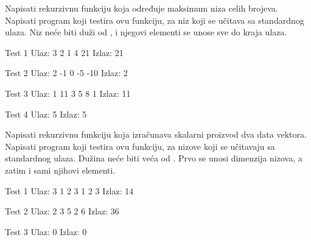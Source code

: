 
\begin{Exercise}[label=109]
Napisati rekurzivnu funkciju koja određuje maksimum niza
  celih brojeva. Napisati program koji testira ovu funkciju, za niz
  koji se učitava sa standardnog ulaza. Niz neće biti duži od , i
  njegovi elementi se unose sve do kraja ulaza.
  
\begin{miditest}
\begin{test}{Test 1}
Ulaz:   3 2 1 4 21    
Izlaz:  21              
\end{test}
\end{miditest}
\begin{miditest}
\begin{test}{Test 2}
Ulaz:   2 -1 0 -5 -10
Izlaz:  2                
\end{test}
\end{miditest}

\begin{miditest}
\begin{test}{Test 3}
Ulaz:  1 11 3 5 8 1    
Izlaz:  11
\end{test}
\end{miditest}
\begin{minitest}
\begin{test}{Test 4}
Ulaz:   5
Izlaz:  5
\end{test}
\end{minitest}
\end{Exercise}
\begin{Answer}[ref=109]
\end{Answer}

\begin{Exercise}[label=110]
Napisati rekurzivnu funkciju koja izračunava skalarni
  proizvod dva data vektora.  Napisati program koji testira ovu
  funkciju, za nizove koji se učitavaju sa standardnog ulaza. Du\v
  zina neće biti veća od . Prvo se unosi dimenzija nizova, a
  zatim i sami njihovi elementi.
  
\begin{miditest}
\begin{test}{Test 1}
Ulaz:    3 1 2 3 1 2 3 
Izlaz:   14                 
\end{test}
\end{miditest}
\begin{minitest}
\begin{test}{Test 2}
Ulaz:   2 3 5 2 6       
Izlaz:   36              
\end{test}
\end{minitest}


\begin{minitest}
\begin{test}{Test 3}
Ulaz:   0
Izlaz:   0
\end{test}
\end{minitest}
\end{Exercise}
\begin{Answer}[ref=110]
\end{Answer}


